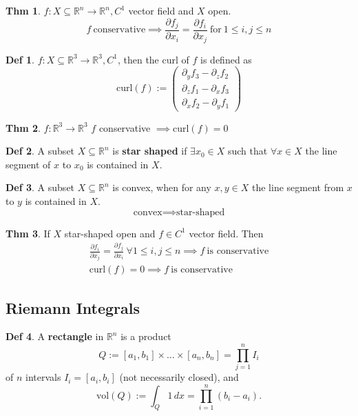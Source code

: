 \documentclass[a4paper, 10pt]{article}
\theoremstyle{definition}
\newtheorem*{theorem}{Thm}
\newtheorem*{definition}{Def}
\newcommand{\R}{\mathbb{R}}
\begin{document}
\begin{theorem}
    \(f: X \subseteq \R^n \to \R^n, C^1\) vector field and \(X\) open.
    \[f \ \text{conservative} \implies \frac{\partial f_j}{\partial x_i} = \frac{\partial f_i}{\partial x_j} \ \text{for} \ 1 \leq i, j \leq n\]
\end{theorem}

\begin{definition}
    \(f: X \subseteq \R^3 \to \R^3, C^1\), then the curl of \(f\) is defined as
    \[\text{curl}(f) := \begin{pmatrix}
        \partial_y f_3 - \partial_z f_2 \\
        \partial_z f_1 - \partial_x f_3 \\
        \partial_x f_2 - \partial_y f_1
    \end{pmatrix}\]
\end{definition}

\begin{theorem}
    \(f: \R^3 \to \R^3\) \(f\) conservative \(\implies \text{curl}(f) = 0\)
\end{theorem}

\begin{definition}
    A subset \(X \subseteq \R^n\) is \textbf{star shaped} if \(\exists x_0 \in X\) such that \(\forall x \in X\) the line segment of \(x\) to \(x_0\) is contained in \(X\).
\end{definition}

\begin{definition}
    A subset \(X \subseteq \R^n\) is convex, when for any \(x, y \in X\) the line segment from \(x\) to \(y\) is contained in \(X\).
    \[\text{convex} \implies \text{star-shaped}\]
\end{definition}

\begin{theorem}
    If \(X\) star-shaped open and \(f \in C^1\) vector field. Then
    \begin{gather*}
        \frac{\partial f_i}{\partial x_j} = \frac{\partial f_j}{\partial x_i} \ \forall 1 \leq i, j \leq n \implies f \ \text{is conservative} \\
        \text{curl}(f) = 0 \implies f \ \text{is conservative}
    \end{gather*}
\end{theorem}

\subsection{Riemann Integrals}
\begin{definition}
    A \textbf{rectangle} in \(\R^n\) is a product
    \[Q := [a_1, b_1] \times \ldots \times [a_n, b_n] = \prod_{j=1}^n I_i\]
    of \(n\) intervals \(I_i = [a_i, b_i]\) (not necessarily closed), and
    \[\text{vol}(Q) := \int_Q 1 \,dx = \prod_{i=1}^n (b_i - a_i).\]
\end{definition}
\end{document}
